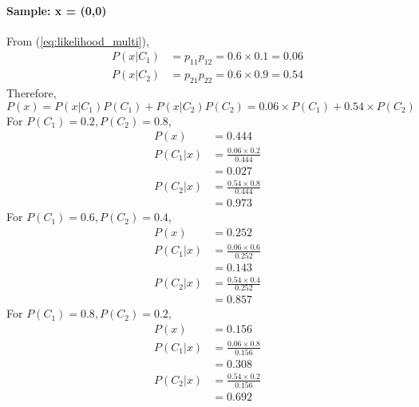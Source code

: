 \paragraph{Sample: x = (0,0)}
From (\ref{eq:likelihood_multi}),
\begin{equation*}
	\begin{split}
		P(x|C_1) &= p_{11}p_{12} = 0.6 \times 0.1 = 0.06\\
		P(x|C_2) &= p_{21}p_{22} = 0.6 \times 0.9 = 0.54
	\end{split}
\end{equation*}
Therefore,
\begin{equation}\label{eq:evidence_multi}
	P(x) = P(x|C_1)P(C_1) + P(x|C_2)P(C_2) = 0.06\times P(C_1) + 0.54 \times P(C_2)
\end{equation}
For $P(C_1) = 0.2, P(C_2) = 0.8$,
\begin{equation}
	\begin{split}
		P(x) &= 0.444\\
		P(C_1|x) &= \frac{0.06\times 0.2}{0.444}\\
		&= 0.027\\
		P(C_2|x) &= \frac{0.54 \times 0.8}{0.444}\\
		&= 0.973
	\end{split}
\end{equation}
For $P(C_1) = 0.6, P(C_2) = 0.4$,
\begin{equation}
	\begin{split}
		P(x) &= 0.252\\
		P(C_1|x) &= \frac{0.06\times 0.6}{0.252}\\
		&= 0.143\\
		P(C_2|x) &= \frac{0.54 \times 0.4}{0.252}\\
		&= 0.857
	\end{split}
\end{equation}
For $P(C_1) = 0.8, P(C_2) = 0.2$,
\begin{equation}
	\begin{split}
		P(x) &= 0.156\\
		P(C_1|x) &= \frac{0.06\times 0.8}{0.156}\\
		&= 0.308\\
		P(C_2|x) &= \frac{0.54 \times 0.2}{0.156}\\
		&= 0.692
	\end{split}
\end{equation}
